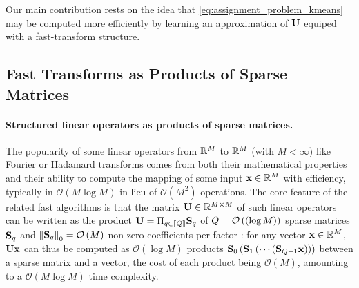 
Our main contribution rests on the idea that \eqref{eq:assignment_problem_kmeans} may be computed more efficiently by learning an approximation of ${\mathbf{U}}$ equiped with a fast-transform structure.


\subsection{Fast Transforms as Products of Sparse Matrices}
\label{sec:palm4msa}

\paragraph{Structured linear operators as products of sparse matrices.}
The popularity of some linear operators from $\mathbb{R}^{M}$ to $\mathbb{R}^{M}$ (with $M<\infty$)
 like Fourier or Hadamard transforms comes from both their mathematical 
 properties and their ability to compute the mapping of some input ${\mathbf{x}}\in\mathbb{R}^M$ with efficiency, typically in $\mathcal{O}\left (M\log M\right )$ in lieu of  
  $\mathcal{O}\left (M^2\right)$ operations.
The core feature of the related fast algorithms is that the matrix ${\mathbf{U}}\in{\mathbb{R}}^{M\times M}$ of such 
linear operators can be written as the product ${\mathbf{U}}=\Pi_{q\in\left \llbracket Q\right \rrbracket}{\mathbf{S}}_q$ 
of $Q=\mathcal{O}\left(\left( \log M \right)\right)$ sparse 
matrices ${\mathbf{S}}_q$ and $\left \|{\mathbf{S}}_q\right \|_0=\mathcal{O}\left( M \right)$ non-zero 
coefficients per factor \cite{LeMagoarou2016Flexible,Morgenstern1975Linear}:
for any vector ${\mathbf{x}}\in{\mathbb{R}}^M$, ${\mathbf{U}}{\mathbf{x}}$ can thus be computed as $\mathcal{O}\left (\log M\right )$ products ${\mathbf{S}}_0 \left ({\mathbf{S}}_1 \left (\cdots \left ({\mathbf{S}}_{Q-1}{\mathbf{x}}\right )\right )\right )$ between a sparse matrix and a vector, the cost of each product being $\mathcal{O}\left (M\right )$, amounting to a $\mathcal{O}(M \log M)$ time complexity.

